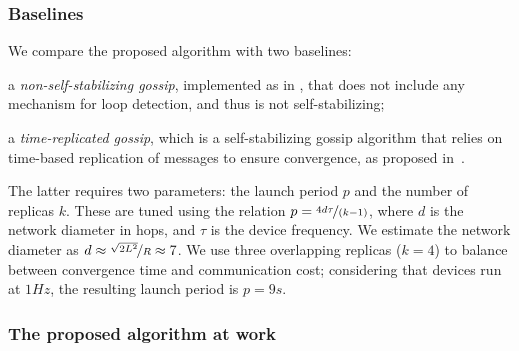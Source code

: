 \documentclass[runningheads]{llncs}
\newenvironment{inlinelist}{\begin{enumerate*}[label=\emph{(\roman*)}]}{\end{enumerate*}}
\begin{document}
\subsubsection{Baselines}

We compare the proposed algorithm with two baselines:
\begin{inlinelist}
    \item a \emph{non-self-stabilizing gossip},
    implemented as in ,
    that does not include any mechanism for loop detection, and thus is not self-stabilizing;
    \item a \emph{time-replicated gossip},
    which is a self-stabilizing gossip algorithm that relies on time-based replication of messages to ensure convergence,
    as proposed in~\cite{DBLP:journals/tomacs/ViroliABDP18}.
\end{inlinelist}
%
The latter requires two parameters:
the launch period $p$ and the number of replicas $k$.
%
These are tuned using the relation $p = \nicefrac{4d\tau}{(k-1)}$,
where $d$ is the network diameter in hops, and $\tau$ is the device frequency.
%
We estimate the network diameter as $d \approx \nicefrac{\sqrt{2L^2}}{R} \approx 7$.
%
We use three overlapping replicas ($k=4$)
to balance between convergence time and communication cost;
considering that devices run at $1Hz$, the resulting launch period is $p = 9s$.

\subsubsection{The proposed algorithm at work}\label{subsubsec:correctness-of-the-algorithm}

\end{document}
